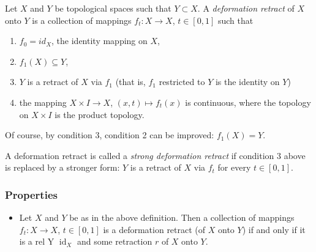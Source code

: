 \documentclass[12pt]{article}
\begin{document}
Let $X$ and $Y$ be topological spaces such that $Y\subset X$.
A \emph{deformation retract} of $X$ onto $Y$ is a collection of
mappings $f_t:X\rightarrow X$, $t\in [0,1]$ such that
\begin{enumerate}
\item $f_0 = id_X$, the identity mapping on $X$,
\item $f_1(X) \subseteq Y$,
\item $Y$ is a retract of $X$ via $f_1$ (that is, $f_1$ restricted to $Y$ is the identity on $Y$)
\item the mapping $X\times I\rightarrow X$, $(x,t)\mapsto f_t(x)$ is continuous, where the topology on $X\times I$ is the product topology.
\end{enumerate}

Of course, by condition 3, condition 2 can be improved: $f_1(X)=Y$.

A deformation retract is called a \emph{strong deformation retract} if condition 3 above is replaced by a stronger form: $Y$ is a retract of $X$ via $f_t$ for every $t\in [0,1]$.

\subsubsection*{Properties}
\begin{itemize}
\item Let $X$ and $Y$ be as in the above definition. Then a collection of
mappings $f_t:X\rightarrow X$, $t\in [0,1]$ is 
a deformation retract (of $X$ onto $Y$) if and only if it is a 
 rel Y  $\operatorname{id}_X$ and some retraction $r$ of $X$ onto $Y$. 
\end{itemize}
\end{document}
